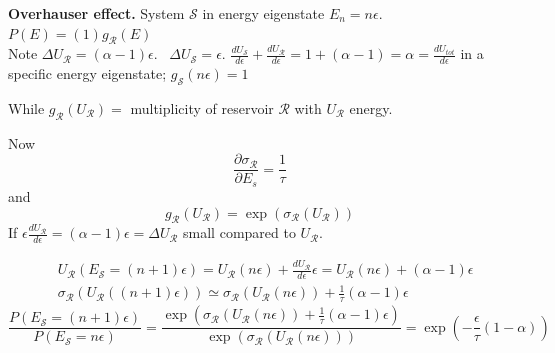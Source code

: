 \documentclass[twoside]{amsart}
\theoremstyle{plain}
\theoremstyle{definition}
\newcommand{\solutionhead}[1]
  {
   \noindent{\small\bf Solution #1.}
   }
\begin{document}
\solutionhead{5} \textbf{Overhauser effect.}  System $\mathcal{S}$ in energy eigenstate $E_n = n\epsilon$.  \\
$P(E) = (1) g_{\mathcal{R}}(E)$ \\
Note $\Delta U_{\mathcal{R}} = (\alpha - 1 )\epsilon$.  \quad \, $\Delta U_{\mathcal{S}} = \epsilon$.  $\frac{dU_{\mathcal{S}} }{ d\epsilon } + \frac{dU_{\mathcal{R} }}{d\epsilon } =  1 + (\alpha -1) = \alpha = \frac{dU_{tot}}{d\epsilon }$ in a specific energy eigenstate; $g_{\mathcal{S} }(n\epsilon) = 1$  

While $g_{\mathcal{R}}(U_{\mathcal{R}}) =$ multiplicity of reservoir $\mathcal{R}$ with $U_{\mathcal{R}}$ energy.  

Now
\[
\frac{ \partial \sigma_{\mathcal{R}} }{ \partial E_s } = \frac{1}{\tau}
\]
and 
\[
g_{\mathcal{R} }(U_{\mathcal{R}}) = \exp{ ( \sigma_{\mathcal{R}}(U_{\mathcal{R}} ) )}
\]
If $\epsilon \frac{dU_{\mathcal{R}} }{ d\epsilon } = (\alpha - 1)\epsilon = \Delta U_{\mathcal{R}}$ small compared to $U_{\mathcal{R}}$.  

\[
\begin{aligned}
  & U_{\mathcal{R}}( E_{\mathcal{S} } = (n+1)\epsilon ) = U_{\mathcal{R} }(n\epsilon ) + \frac{dU_{\mathcal{R}} }{ d\epsilon } \epsilon = U_{\mathcal{R}}(n\epsilon ) + (\alpha - 1)\epsilon  \\
  & \sigma_{\mathcal{R}}(U_{\mathcal{R} }((n+1)\epsilon ) ) \simeq \sigma_{\mathcal{R} }(U_{\mathcal{R}}(n\epsilon )) + \frac{1}{\tau} (\alpha - 1) \epsilon 
\end{aligned}
\]
\[
\frac{ P(E_{\mathcal{S}} = (n+1)\epsilon ) }{ P(E_{\mathcal{S}} = n\epsilon ) } = \frac{ \exp{ ( \sigma_{\mathcal{R}}(U_{\mathcal{R}}(n\epsilon) ) + \frac{1}{\tau}(\alpha -1)\epsilon ) } }{ \exp{ (\sigma_{\mathcal{R}} (U_{\mathcal{R}}(n\epsilon) ) )} } = \boxed{ \exp{ \left( - \frac{\epsilon}{\tau} ( 1 - \alpha ) \right) } }
\]
\end{document}
